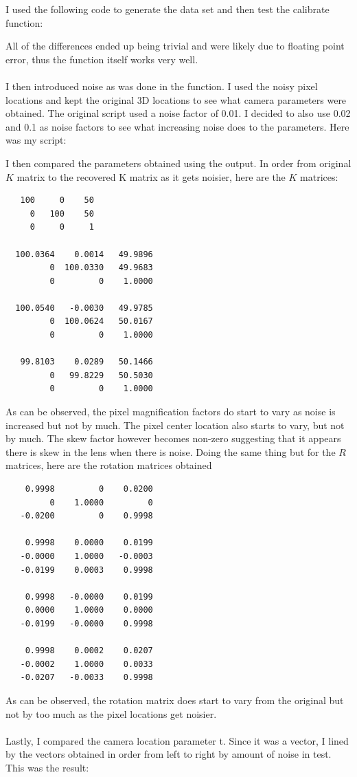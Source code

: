 \documentclass[11pt,psfig]{article}
\begin{document}
I used the following code to generate the data set and then test the calibrate function:

All of the differences ended up being trivial and were likely due to floating point error, thus the function itself works very well. \\
\\
I then introduced noise as was done in the function. I used the noisy pixel locations and kept the original 3D locations to see what camera parameters were obtained. The original script used a noise factor of 0.01. I decided to also use 0.02 and 0.1 as noise factors to see what increasing noise does to the parameters. Here was my script:


I then compared the parameters obtained using the output. In order from original $K$ matrix to the recovered K matrix as it gets noisier, here are the $K$ matrices:
\begin{verbatim}
   100     0    50
     0   100    50
     0     0     1

  100.0364    0.0014   49.9896
         0  100.0330   49.9683
         0         0    1.0000

  100.0540   -0.0030   49.9785
         0  100.0624   50.0167
         0         0    1.0000

   99.8103    0.0289   50.1466
         0   99.8229   50.5030
         0         0    1.0000
\end{verbatim}

As can be observed, the pixel magnification factors do start to vary as noise is increased but not by much. The pixel center location also starts to vary, but not by much. The skew factor however becomes non-zero suggesting that it appears there is skew in the lens when there is noise. 
\newpage
Doing the same thing but for the $R$ matrices, here are the rotation matrices obtained

\begin{verbatim}
    0.9998         0    0.0200
         0    1.0000         0
   -0.0200         0    0.9998

    0.9998    0.0000    0.0199
   -0.0000    1.0000   -0.0003
   -0.0199    0.0003    0.9998

    0.9998   -0.0000    0.0199
    0.0000    1.0000    0.0000
   -0.0199   -0.0000    0.9998

    0.9998    0.0002    0.0207
   -0.0002    1.0000    0.0033
   -0.0207   -0.0033    0.9998
\end{verbatim}
As can be observed, the rotation matrix does start to vary from the original but not by too much as the pixel locations get noisier. \\
\\
Lastly, I compared the camera location parameter t. Since it was a vector, I lined by the vectors obtained in order from left to right by amount of noise in test. This was the result:
\end{document}

